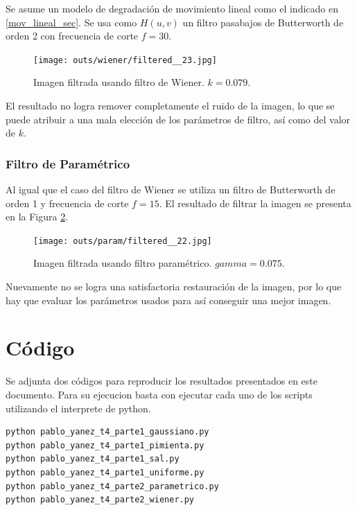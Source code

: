 \documentclass[
  letterpaper,
  twocolumn,
  9pt,
  journal,
  final]{IEEEtran}
\begin{document}
Se asume un modelo de degradación de movimiento lineal como el indicado en \ref{mov_lineal_sec}. Se usa como $H(u,v)$ un filtro pasabajos de Butterworth de orden 2 con frecuencia de corte $f=30$.

\begin{figure}[!tbh]
  \centering
  \texttt{[image: outs/wiener/filtered\_\_23.jpg]}
  \caption{Imagen filtrada usando filtro de Wiener. $k=0.079$.}
  \label{wiener_fitlro}
\end{figure}

El resultado no logra remover completamente el ruido de la imagen, lo que se puede atribuir a una mala elección de los parámetros de filtro, así como del valor de $k$.

\subsubsection{Filtro de Paramétrico}

Al igual que el caso del filtro de Wiener se utiliza un filtro de Butterworth de orden 1 y frecuencia de corte $f=15$. El resultado de filtrar la imagen se presenta en la Figura \ref{param_filtrado}.

\begin{figure}[!tbh]
  \centering
  \texttt{[image: outs/param/filtered\_\_22.jpg]}
  \caption{Imagen filtrada usando filtro paramétrico. $gamma=0.075$.}
  \label{param_filtrado}
\end{figure}

Nuevamente no se logra una satisfactoria restauración de la imagen, por lo que hay que evaluar los parámetros usados para así conseguir una mejor imagen.

\section{Código}

Se adjunta dos códigos para reproducir los resultados presentados en este documento. Para su ejecucion basta con ejecutar cada uno de los scripts utilizando el interprete de python.

\begin{verbatim}
python pablo_yanez_t4_parte1_gaussiano.py
python pablo_yanez_t4_parte1_pimienta.py
python pablo_yanez_t4_parte1_sal.py
python pablo_yanez_t4_parte1_uniforme.py
python pablo_yanez_t4_parte2_parametrico.py
python pablo_yanez_t4_parte2_wiener.py
\end{verbatim}


\nocite{*}


\end{document}
